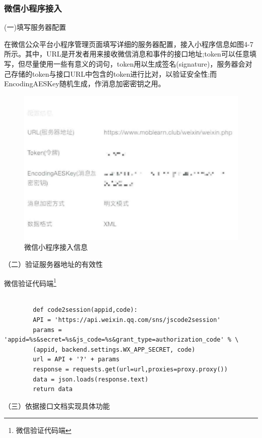 \documentclass[a4paper]{ltxdoc}
\begin{document}
{		\subsubsection{微信小程序接入}
		(一)填写服务器配置 
		
		在微信公众平台小程序管理页面填写详细的服务器配置，接入小程序信息如图4-7所示。其中，URL是开发者用来接收微信消息和事件的接口地址;token可以任意填写，但尽量使用一些有意义的词句，token用以生成签名(signature)，服务器会对己存储的token与接口URL中包含的token进行比对，以验证安全性;而EncodingAESKey随机生成，作消息加密密钥之用。
		
		\begin{figure}[!htb]
			\centering
			\includegraphics[width=0.5\linewidth]{images/4.jpg}
			\caption{微信小程序接入信息}
		\end{figure}
		
		（二）验证服务器地址的有效性
		
		微信验证代码端\footnote{微信验证代码端}
		\begin{verbatim}
		
		def code2session(appid,code):
		API = 'https://api.weixin.qq.com/sns/jscode2session'
		params = 'appid=%s&secret=%s&js_code=%s&grant_type=authorization_code' % \
		(appid, backend.settings.WX_APP_SECRET, code)
		url = API + '?' + params
		response = requests.get(url=url,proxies=proxy.proxy())
		data = json.loads(response.text)
		return data
		\end{verbatim}
		
		
		（三）依据接口文档实现具体功能
		
}
\end{document}
